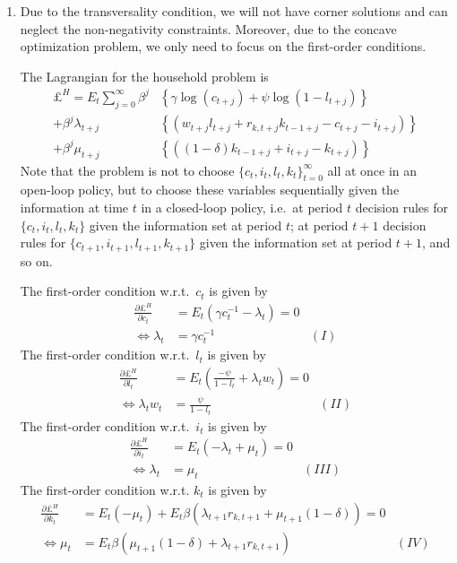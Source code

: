 \begin{enumerate}

\item Due to the transversality condition,
  we will not have corner solutions and can neglect the non-negativity constraints.
Moreover, due to the concave optimization problem, we only need to focus on the first-order conditions.

The Lagrangian for the household problem is
\begin{align*}
\pounds^H = E_t\sum_{j=0}^{\infty}\beta^j&\left \{ \gamma \log(c_{t+j}) + \psi \log(1-l_{t+j}) \right \}
\\
+\beta^j \lambda_{t+j} &\left \{ \left(w_{t+j} l_{t+j} + r_{k,t+j} k_{t-1+j} - c_{t+j} - i_{t+j}\right) \right \}
\\
+\beta^j \mu_{t+j} &\left \{ \left((1-\delta)k_{t-1+j} + i_{t+j} - k_{t+j}\right) \right \}
\end{align*}
Note that the problem is not to choose \( {\{c_t,i_t,l_t,k_{t} \}}_{t=0}^\infty \) all at once in an open-loop policy,
  but to choose these variables sequentially given the information at time \(t\) in a closed-loop policy,
  i.e.\ at period \(t\) decision rules for \({\{c_t,i_t,l_t,k_{t}\}}\) given the information set at period \(t\);
  at period \(t+1\) decision rules for \({\{c_{t+1},i_{t+1},l_{t+1},k_{t+1}\}}\) given the information set at period \(t+1\),
  and so on.

The first-order condition w.r.t.\
\(c_t\) is given by
\begin{align*}
\frac{\partial \pounds^H}{\partial c_{t}} &= E_t \left(\gamma c_t^{-1}-\lambda_{t}\right) = 0
\\
\Leftrightarrow \lambda_{t} &= \gamma c_{t}^{-1} & (I)
\end{align*}
The first-order condition w.r.t.\
\(l_t\) is given by
\begin{align*}
\frac{\partial \pounds^H}{\partial l_{t}} &= E_t \left(\frac{-\psi}{1-l_{t}} + \lambda_{t} w_{t}\right) = 0
\\
\Leftrightarrow \lambda_{t} w_{t} &= \frac{\psi}{1-l_{t}} &(II)
\end{align*}
The first-order condition w.r.t.\
\(i_{t}\) is given by
\begin{align*}
\frac{\partial \pounds^H}{\partial i_{t}} &= E_t \left(-\lambda_{t} + \mu_{t}\right) = 0
\\
\Leftrightarrow \lambda_{t} &= \mu_{t} & (III)
\end{align*}
The first-order condition w.r.t.
\(k_{t}\) is given by
\begin{align*}
\frac{\partial \pounds^H}{\partial k_{t}} &= E_t (-\mu_{t}) + 
	E_t \beta \left(\lambda_{t+1} r_{k,t+1} + \mu_{t+1}(1-\delta)\right) = 0
\\
\Leftrightarrow \mu_{t} &= E_t \beta(\mu_{t+1}(1-\delta) + \lambda_{t+1} r_{k,t+1}) & (IV)
\end{align*}


\end{enumerate}
